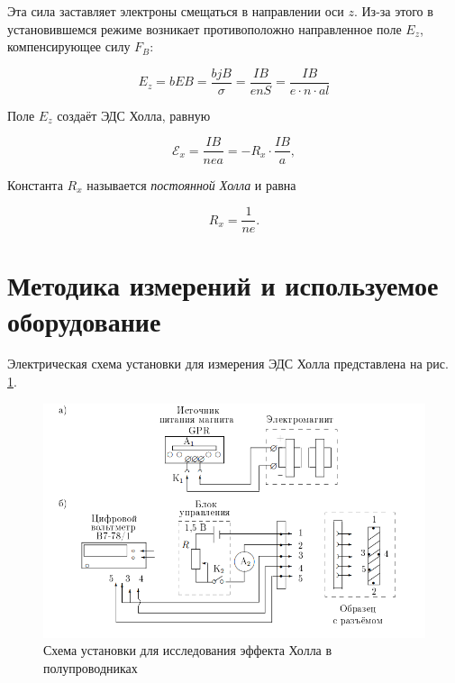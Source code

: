 \documentclass[a4paper, 12pt]{article}
\begin{document}
    Эта сила заставляет электроны смещаться в направлении оси $z$. Из-за этого в установившемся режиме возникает противоположно направленное поле $E_z$, компенсирующее силу $F_B$:

    \begin{equation}
        E_z = bEB = \frac{bjB}{\sigma} = \frac{IB}{enS} = \frac{IB}{e \cdot n \cdot al}
    \end{equation}
    
    Поле $E_z$ создаёт ЭДС Холла, равную

    \begin{equation}\label{1}
        \mathcal{E}_x = \frac{IB}{nea} = - R_x \cdot \frac{IB}{a},
    \end{equation}

    Константа $R_x$ называется \textit{постоянной Холла} и равна

    \begin{equation}
        \label{eq_Rx}
        R_x=\frac{1}{ne}.
    \end{equation}
    
    \section{Методика измерений и используемое оборудование}

    Электрическая схема установки для измерения ЭДС Холла представлена на рис. \ref{installation}.

    \begin{figure}[H]
        \centering
        \includegraphics[width = 15 cm]{images/installation.png}
        \caption{Схема установки для исследования эффекта Холла в полупроводниках}
        \label{installation}
    \end{figure}
\end{document}
